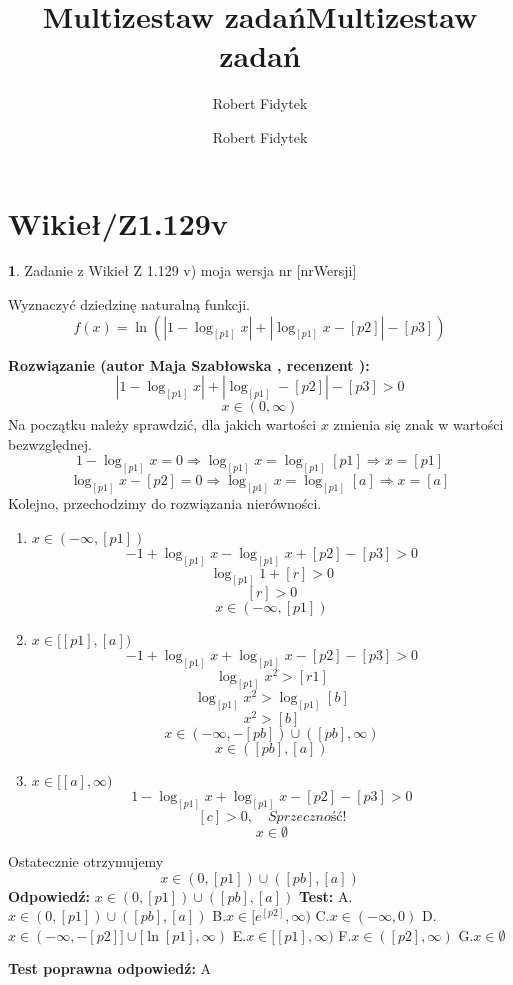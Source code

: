 \documentclass[12pt, a4paper]{article}
\title{Multizestaw zadań}
\author{Robert Fidytek}
\date{}\documentclass[12pt, a4paper]{article}
\title{Multizestaw zadań}
\author{Robert Fidytek}
\date{}
\theoremstyle{definition} %
\newtheorem{zad}{}
\theoremstyle{definition} %
\newtheorem{zad}{}
\newcommand{\kategoria}[1]{\section{#1}} %
\newcommand{\zadStart}[1]{\begin{zad}#1\newline} %
\newcommand{\zadStop}{\end{zad}}   %
\newcommand{\rozwStart}[2]{\noindent \textbf{Rozwiązanie (autor #1 , recenzent #2): }\newline} %
\newcommand{\rozwStop}{\newline}                                            %
\newcommand{\odpStart}{\noindent \textbf{Odpowiedź:}\newline}    %
\newcommand{\odpStop}{\newline}                                             %
\newcommand{\testStart}{\noindent \textbf{Test:}\newline} %
\newcommand{\testStop}{\newline} %
\newcommand{\kluczStart}{\noindent \textbf{Test poprawna odpowiedź:}\newline} %
\newcommand{\kluczStop}{\newline} %
\begin{document}
\maketitle


\kategoria{Wikieł/Z1.129v}
\zadStart{Zadanie z Wikieł Z 1.129 v) moja wersja nr [nrWersji]}


Wyznaczyć dziedzinę naturalną funkcji.
$$f(x)=\ln(|1-\log_{[p1]}x|+|\log_{[p1]}x-[p2]|-[p3])$$
\zadStop

\rozwStart{Maja Szabłowska}{}
$$|1-\log_{[p1]}x|+|\log_{[p1]}-[p2]|-[p3]>0$$
$$x\in(0,\infty)$$
Na początku należy sprawdzić, dla jakich wartości $x$ zmienia się znak w wartości bezwzględnej.
$$1-\log_{[p1]}x=0 \Rightarrow \log_{[p1]}x=\log_{[p1]}[p1] \Rightarrow x=[p1]$$
$$\log_{[p1]}x-[p2]=0 \Rightarrow \log_{[p1]}x=\log_{[p1]}[a]\Rightarrow x=[a]$$
Kolejno, przechodzimy do rozwiązania nierówności.
\begin{enumerate}
    \item $x\in(-\infty, [p1])$
    $$-1+\log_{[p1]}x-\log_{[p1]}x+[p2]-[p3]>0$$
    $$\log_{[p1]}1+[r]>0$$
    $$[r]>0$$
    $$x\in(-\infty, [p1])$$
    
    \item $x\in[[p1],[a])$
    $$-1+\log_{[p1]}x+\log_{[p1]}x-[p2]-[p3]>0$$
    $$\log_{[p1]}x^{2}>[r1]$$
    $$\log_{[p1]}x^{2}>\log_{[p1]}[b]$$
    $$x^{2}>[b]$$
    $$x\in(-\infty, -[pb])\cup([pb],\infty)$$
    $$x\in([pb],[a])$$
    
    \item $x\in [[a],\infty)$
    $$1-\log_{[p1]}x+\log_{[p1]}x-[p2]-[p3]>0$$
    $$[c]>0, \quad \textit{Sprzeczność!}$$
    $$x\in\emptyset$$
\end{enumerate}
Ostatecznie otrzymujemy
$$x\in(0, [p1])\cup([pb],[a])$$
\rozwStop
\odpStart
$x\in(0, [p1])\cup([pb],[a])$
\odpStop
\testStart
A.$x\in(0, [p1])\cup([pb],[a])$
B.$x\in[e^{[p2]},\infty)$
C.$x\in(-\infty, 0)$
D.$x\in(-\infty, -[p2]] \cup [\ln[p1],\infty)$
E.$x\in[[p1],\infty)$
F.$x\in([p2],\infty)$
G.$x\in\emptyset$

\testStop
\kluczStart
A
\kluczStop
\end{document}
